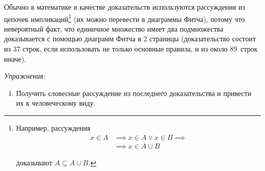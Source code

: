 Обычно в математике в качестве доказательств используются рассуждения
из цепочек импликаций\footnote{
	Например, рассуждения
	\[
		\begin{aligned}
			x\in A
			 & \implies x\in A\lor x\in B\implies \\
			 & \implies x\in A\cup B
		\end{aligned}
	\]

	доказывают $A\subseteq A\cup B$.
} (их можно перевести в диаграммы Фитча),
потому что невероятный факт, что единичное множество имеет два подмножества доказывается
с помощью диаграмм Фитча в 2 страницы (доказательство состоит из 37 строк, если
использовать не только основные правила, и из около 89~строк иначе).

	{\it Упражнения:}
\begin{enumerate}
	\item{}Получить словесные рассуждение из последнего доказательства и привести их
	к человеческому виду.
\end{enumerate}

